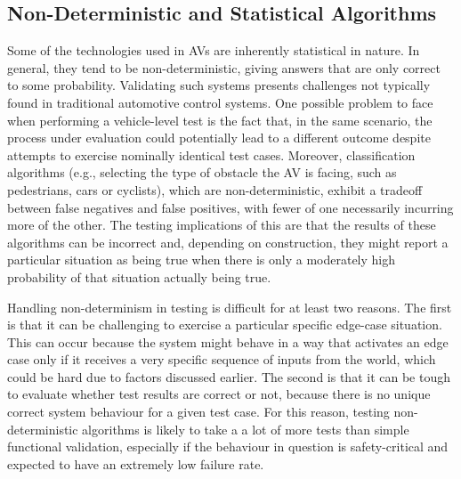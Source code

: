 \documentclass[a4paper, 10pt]{article}
\begin{document}
\subsection{Non-Deterministic and Statistical Algorithms}
Some of the technologies used in AVs are inherently statistical in nature. In general, they tend to be non-deterministic, giving answers that are only correct to some probability. Validating such systems presents challenges not typically found in traditional automotive control systems. One possible problem to face when performing a vehicle-level test is the fact that, in the same scenario, the process under evaluation could potentially lead to a different outcome despite attempts to exercise nominally identical test cases. Moreover, classification algorithms (e.g., selecting the type of obstacle the AV is facing, such as pedestrians, cars or cyclists), which are non-deterministic, exhibit a tradeoff between false negatives and false positives, with fewer of one necessarily incurring more of the other. The testing implications of this are that the results of these algorithms can be incorrect and, depending on construction, they might report a particular situation as being true when there is only a moderately high probability of that situation actually being true.

Handling non-determinism in testing is difficult for at least two reasons. The first is that it can be challenging to exercise a particular specific edge-case situation. This can occur because the system might behave in a way that activates an edge case only if it receives a very specific sequence of inputs from the world, which could be hard due to factors discussed earlier. The second is that it can be tough to evaluate whether test results are correct or not, because there is no unique correct system behaviour for a given test case. For this reason, testing non-deterministic algorithms is likely to take a a lot of more tests than simple functional validation, especially if the behaviour in question is safety-critical and expected to have an extremely low failure rate.

\end{document}
